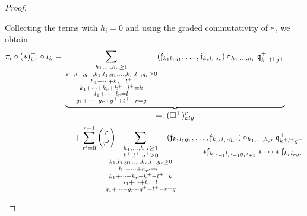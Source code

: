 \documentclass[\MainFolder/Text.tex]{subfiles}
\begin{document}
\begin{proof}
\begin{ProofList}
Collecting the terms with $h_i=0$ and using the graded commutativity of $*$, we obtain
\begin{align*}
\pi_l \circ (*)^+_{i,r} \circ \iota_k &= \begin{multlined}[t]\underbrace{\sum_{\substack{h_1, \dotsc, h_r \ge 1\\ k^+, l^+, g^+, k_1, l_1, g_1, \dotsc, k_r, l_r, g_r\ge 0 \\  h_1 + \dotsb + h_{r} = l^+ \\k_1 + \dotsb + k_r + k^+ - l^+ = k \\ l_1+ \dotsb + l_r = l \\ g_1 + \dotsb + g_r + g^+ + l^+ - r = g}} (\HTP_{k_1 l_1 g_1},\dotsc,\HTP_{k_r l_r g_r})\circ_{h_1,\dotsc,h_r}\OPQ_{k^+ l^+ g^+}^+}_{\displaystyle=:(\square^+)^r_{klg}}\\
+ \sum_{r'=0}^{r-1} \binom{r}{r'}\hspace{-.5cm}\sum_{\substack{h_1,\dotsc,h_{r'}\ge 1 \\
k^+,l^+,g^+ \ge 0\\
k_1,l_1,g_1,\dotsc,k_r,l_r,g_r\ge 0 \\
h_1 + \dotsb + h_{r'} = l^+ \\
k_1 + \dotsb + k_r + k^+ - l^+ = k \\
l_1 + \dotsb + l_r = l \\
g_1 + \dotsb + g_r + g^+ + l^+ - r = g }}\hspace{-.5cm}\begin{aligned}[t]
(\HTP_{k_1 l_1 g_1},\dotsc,\HTP_{k_{r'} l_{r'} g_{r'}})\circ_{h_1,\dotsc, h_{r'}} \OPQ^+_{k^+ l^+ g^+}&\\
\Star \HTP_{k_{r'+1} l_{r'+1} g_{r' + 1}}\Star\dotsb\Star\HTP_{k_r l_r g_r}&
\end{aligned}
\end{multlined} \\

\end{align*}
\end{ProofList}
\end{proof}
\end{document}
